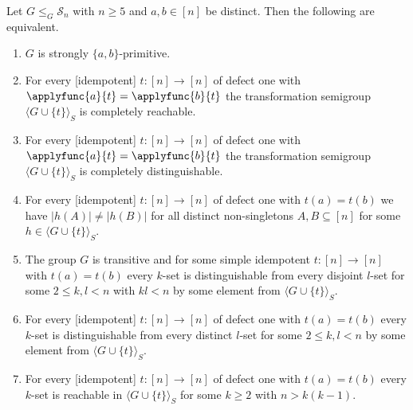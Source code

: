\begin{theorem}
	\label{sync_max:thm:stronglyab-idempotent}
	Let $G \le_G \mathcal S_n$ with $n \ge 5$ %
	and $a,b \in [n]$ be distinct.
	Then the following are equivalent.
	\begin{enumerate}
		\item \label{sync_max:thm:stronglyab-idempotent:item:abstrong} $G$ is strongly $\{a,b\}$-primitive.	
		
		\item \label{sync_max:thm:stronglyab-idempotent:item:reach} For every [idempotent] $t \colon [n] \to [n]$ of defect one
		with $\applyfunc{a}{t} = \applyfunc{b}{t}$
		the transformation semigroup $\langle G \cup \{t\} \rangle_S$
		is completely reachable.
		
		\item \label{sync_max:thm:stronglyab-idempotent:item:dist} For every [idempotent] $t \colon [n] \to [n]$ of defect one
		with $\applyfunc{a}{t} = \applyfunc{b}{t}$
		the transformation semigroup $\langle G \cup \{t\} \rangle_S$
		is completely distinguishable.		
		
		\item \label{sync_max:thm:stronglyab-idempotent:item:card} For every [idempotent] $t \colon [n] \to [n]$ of defect one 
		with $t(a) = t(b)$ we have $|h(A)| \ne |h(B)|$ for all distinct non-singletons $A,B \subseteq [n]$
		for some $h \in \langle G \cup \{t\} \rangle_S$.
		
		\item \label{sync_max:thm:stronglyab-idempotent:item:trans-disj} The group $G$ is transitive and for some simple idempotent
		$t \colon [n] \to [n]$
		with $t(a) = t(b)$ every $k$-set is distinguishable from every disjoint $l$-set for some $2 \le k,l < n$ with $kl < n$
		by some element from $\langle G \cup \{t\} \rangle_S$.		
				
		\item \label{sync_max:thm:stronglyab-idempotent:item:kl} For every [idempotent] $t \colon [n] \to [n]$ of defect one with $t(a) = t(b)$ 
		every $k$-set is distinguishable from every distinct $l$-set for some $2 \le k,l < n$ by some element from $\langle G \cup \{t\} \rangle_S$.	
		
		\item \label{syncmax:stronglyab-reach:item:two-sets} For every [idempotent] $t \colon [n] \to [n]$ of defect one with $t(a) = t(b)$ 
	  	every $k$-set is reachable in $\langle G \cup \{t\} \rangle_S$
	  	for some $k \ge 2$ with $n > k(k-1)$.
	\end{enumerate} 
\end{theorem}
